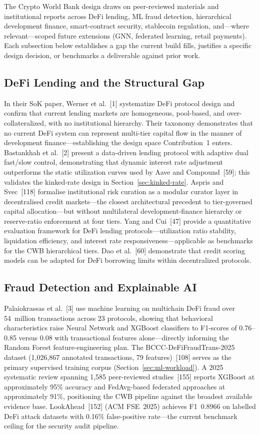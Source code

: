\documentclass[12pt,a4paper]{report}
\begin{document}
The Crypto World Bank design draws on peer-reviewed materials and institutional reports across DeFi lending, ML fraud detection, hierarchical development finance, smart-contract security, stablecoin regulation, and---where relevant---scoped future extensions (GNN, federated learning, retail payments). Each subsection below establishes a gap the current build fills, justifies a specific design decision, or benchmarks a deliverable against prior work.

\subsection{DeFi Lending and the Structural Gap}

In their SoK paper, Werner et al.~[1] systematize DeFi protocol design and confirm that current lending markets are homogeneous, pool-based, and over-collateralized, with no institutional hierarchy. Their taxonomy demonstrates that no current DeFi system can represent multi-tier capital flow in the manner of development finance---establishing the design space Contribution~1 enters. Bastankhah et al.~[2] present a data-driven lending protocol with adaptive dual fast/slow control, demonstrating that dynamic interest rate adjustment outperforms the static utilization curves used by Aave and Compound~[59]; this validates the kinked-rate design in Section~\ref{sec:kinked-rate}. Aspris and Svec~[118] formalise institutional risk curation as a modular curator layer in decentralised credit markets---the closest architectural precedent to tier-governed capital allocation---but without multilateral development-finance hierarchy or reserve-ratio enforcement at four tiers. Yang and Cui~[47] provide a quantitative evaluation framework for DeFi lending protocols---utilization ratio stability, liquidation efficiency, and interest rate responsiveness---applicable as benchmarks for the CWB hierarchical tiers. Dao et al.~[60] demonstrate that credit scoring models can be adapted for DeFi borrowing limits within decentralized protocols.

\subsection{Fraud Detection and Explainable AI}
\label{sec:lit-ml-oracle}

Palaiokrassas et al.~[3] use machine learning on multichain DeFi fraud over 54~million transactions across 23 protocols, showing that behavioral characteristics raise Neural Network and XGBoost classifiers to F1-scores of 0.76--0.85 versus 0.08 with transactional features alone---directly informing the Random Forest feature-engineering plan. The BCCC-DeFiFraudTrans-2025 dataset (1,026,867 annotated transactions, 79 features)~[108] serves as the primary supervised training corpus (Section~\ref{sec:ml-workload}). A 2025 systematic review spanning 1,585 peer-reviewed studies~[155] reports XGBoost at approximately 95\% accuracy and FedAvg-based federated approaches at approximately 91\%, positioning the CWB pipeline against the broadest available evidence base. LookAhead~[152] (ACM FSE~2025) achieves F1~0.8966 on labelled DeFi attack datasets with 0.16\% false-positive rate---the current benchmark ceiling for the security audit pipeline.
\end{document}
